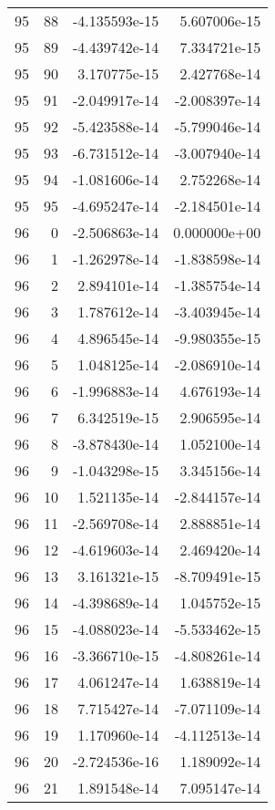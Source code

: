 \begin{tabular}{rrrr}
  95 &   88 & -4.135593e-15 &  5.607006e-15 \\
  95 &   89 & -4.439742e-14 &  7.334721e-15 \\
  95 &   90 &  3.170775e-15 &  2.427768e-14 \\
  95 &   91 & -2.049917e-14 & -2.008397e-14 \\
  95 &   92 & -5.423588e-14 & -5.799046e-14 \\
  95 &   93 & -6.731512e-14 & -3.007940e-14 \\
  95 &   94 & -1.081606e-14 &  2.752268e-14 \\
  95 &   95 & -4.695247e-14 & -2.184501e-14 \\
  96 &    0 & -2.506863e-14 &  0.000000e+00 \\
  96 &    1 & -1.262978e-14 & -1.838598e-14 \\
  96 &    2 &  2.894101e-14 & -1.385754e-14 \\
  96 &    3 &  1.787612e-14 & -3.403945e-14 \\
  96 &    4 &  4.896545e-14 & -9.980355e-15 \\
  96 &    5 &  1.048125e-14 & -2.086910e-14 \\
  96 &    6 & -1.996883e-14 &  4.676193e-14 \\
  96 &    7 &  6.342519e-15 &  2.906595e-14 \\
  96 &    8 & -3.878430e-14 &  1.052100e-14 \\
  96 &    9 & -1.043298e-15 &  3.345156e-14 \\
  96 &   10 &  1.521135e-14 & -2.844157e-14 \\
  96 &   11 & -2.569708e-14 &  2.888851e-14 \\
  96 &   12 & -4.619603e-14 &  2.469420e-14 \\
  96 &   13 &  3.161321e-15 & -8.709491e-15 \\
  96 &   14 & -4.398689e-14 &  1.045752e-15 \\
  96 &   15 & -4.088023e-14 & -5.533462e-15 \\
  96 &   16 & -3.366710e-15 & -4.808261e-14 \\
  96 &   17 &  4.061247e-14 &  1.638819e-14 \\
  96 &   18 &  7.715427e-14 & -7.071109e-14 \\
  96 &   19 &  1.170960e-14 & -4.112513e-14 \\
  96 &   20 & -2.724536e-16 &  1.189092e-14 \\
  96 &   21 &  1.891548e-14 &  7.095147e-14 \\

\end{tabular}
